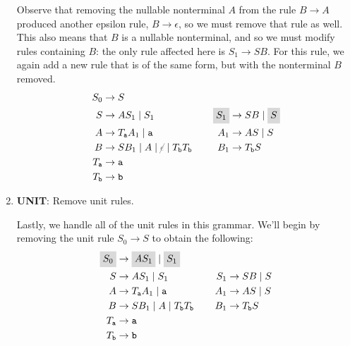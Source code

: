\begin{example}
\begin{enumerate}
Observe that removing the nullable nonterminal $A$ from the rule $B \rightarrow A$ produced another epsilon rule, $B \rightarrow \epsilon$, so we must remove that rule as well. This also means that $B$ is a nullable nonterminal, and so we must modify rules containing $B$: the only rule affected here is $S_{1} \rightarrow SB$. For this rule, we again add a new rule that is of the same form, but with the nonterminal $B$ removed.
\begin{equation*}
\begin{aligned}[t]
S_{0}					&\rightarrow S \\
S						&\rightarrow AS_{1} \mid S_{1} \phantom{\highlightmath{S_{0}}} \\
A						&\rightarrow T_{\texttt{a}}A_{1} \mid \texttt{a} \\
B						&\rightarrow SB_{1} \mid A \mid {\color{\neutralcolour}\cancel{\epsilon}} \mid T_{\texttt{b}}T_{\texttt{b}} \\
T_{\texttt{a}}				&\rightarrow \texttt{a} \\
T_{\texttt{b}}				&\rightarrow \texttt{b}
\end{aligned}
\hspace{0.75cm}
\begin{aligned}[t]
\phantom{S_{0}} & \\
\highlightmath{S_{1}}			&\rightarrow SB \mid \highlightmath{S} \\
A_{1}					&\rightarrow AS \mid S \\
B_{1}					&\rightarrow T_{\texttt{b}}S
\end{aligned}
\end{equation*}

\item \textbf{UNIT}: Remove unit rules.

Lastly, we handle all of the unit rules in this grammar. We'll begin by removing the unit rule $S_{0} \rightarrow S$ to obtain the following:
\begin{equation*}
\begin{aligned}[t]
\highlightmath{S_{0}}			&\rightarrow \highlightmath{AS_{1}} \mid \highlightmath{S_{1}} \\
S						&\rightarrow AS_{1} \mid S_{1} \\
A						&\rightarrow T_{\texttt{a}}A_{1} \mid \texttt{a} \\
B						&\rightarrow SB_{1} \mid A \mid T_{\texttt{b}}T_{\texttt{b}} \\
T_{\texttt{a}}				&\rightarrow \texttt{a} \\
T_{\texttt{b}}				&\rightarrow \texttt{b}
\end{aligned}
\hspace{0.75cm}
\begin{aligned}[t]
\phantom{S_{0}} & \phantom{\highlightmath{S_{0}}} \\
S_{1}					&\rightarrow SB \mid S \\
A_{1}					&\rightarrow AS \mid S \\
B_{1}					&\rightarrow T_{\texttt{b}}S
\end{aligned}
\end{equation*}


\end{enumerate}
\end{example}

